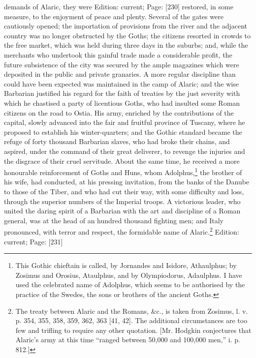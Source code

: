 demands of Alaric, they were Edition: current; Page: [230] restored, in some measure, to the enjoyment of peace and plenty. Several of the gates were cautiously opened; the importation of provisions from the river and the adjacent country was no longer obstructed by the Goths; the citizens resorted in crowds to the free market, which was held during three days in the suburbs; and, while the merchants who undertook this gainful trade made a considerable profit, the future subsistence of the city was secured by the ample magazines which were deposited in the public and private granaries. A more regular discipline than could have been expected was maintained in the camp of Alaric; and the wise Barbarian justified his regard for the faith of treaties by the just severity with which he chastised a party of licentious Goths, who had insulted some Roman citizens on the road to Ostia. His army, enriched by the contributions of the capital, slowly advanced into the fair and fruitful province of Tuscany, where he proposed to establish his winter-quarters; and the Gothic standard became the refuge of forty thousand Barbarian slaves, who had broke their chains, and aspired, under the command of their great deliverer, to revenge the injuries and the disgrace of their cruel servitude. About the same time, he received a more honourable reinforcement of Goths and Huns, whom Adolphus,\footnote{This Gothic chieftain is called, by Jornandes and Isidore, Athaulphus; by Zosimus and Orosius, Ataulphus, and by Olympiodorus, Adaulphus. I have used the celebrated name of Adolphus, which seems to be authorised by the practice of the Swedes, the sons or brothers of the ancient Goths.} the brother of his wife, had conducted, at his pressing invitation, from the banks of the Danube to those of the Tiber, and who had cut their way, with some difficulty and loss, through the superior numbers of the Imperial troops. A victorious leader, who united the daring spirit of a Barbarian with the art and discipline of a Roman general, was at the head of an hundred thousand fighting men; and Italy pronounced, with terror and respect, the formidable name of Alaric.\footnote{The treaty between Alaric and the Romans, \&c., is taken from Zosimus, l. v. p. 354, 355, 358, 359, 362, 363 [41, 42]. The additional circumstances are too few and trifling to require any other quotation. [Mr. Hodgkin conjectures that Alaric\texthebrew{}’s army at this time \texthebrew{“}ranged between 50,000 and 100,000 men,\texthebrew{}” i. p. 812.]}
Edition: current; Page: [231]

